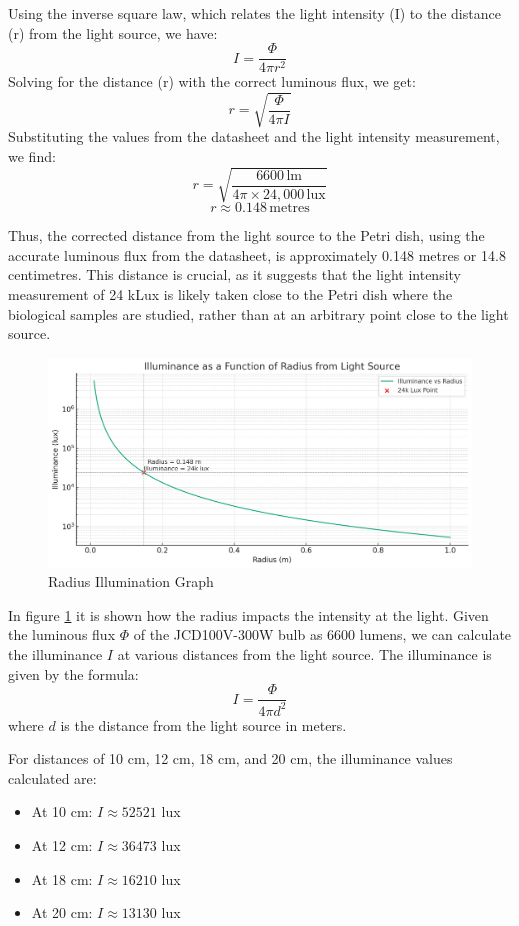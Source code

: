 Using the inverse square law, which relates the light intensity (I) to the distance (r) from the light source, we have:
\[
I = \frac{\Phi}{4\pi r^2}
\]
Solving for the distance (r) with the correct luminous flux, we get:
\[
r = \sqrt{\frac{\Phi}{4\pi I}}
\]
Substituting the values from the datasheet and the light intensity measurement, we find:
\[
r = \sqrt{\frac{6600\, \text{lm}}{4\pi \times 24,000\, \text{lux}}}
\]
\[
r \approx 0.148\, \text{metres}
\]

Thus, the corrected distance from the light source to the Petri dish, using the accurate luminous flux from the datasheet, is approximately 0.148 metres or 14.8 centimetres. This distance is crucial, as it suggests that the light intensity measurement of 24 kLux is likely taken close to the Petri dish where the biological samples are studied, rather than at an arbitrary point close to the light source.

\begin{figure}
    \centering
    \includegraphics[width=\linewidth]{radius-illumination.jpg}
    \caption{Radius Illumination Graph}
    \label{fig:radius-illumination}
\end{figure}

In figure \ref{fig:radius-illumination} it is shown how the radius impacts the intensity at the light. 
Given the luminous flux \( \Phi \) of the JCD100V-300W bulb as 6600 lumens, we can calculate the illuminance \( I \) at various distances from the light source. The illuminance is given by the formula:
\[ I = \frac{\Phi}{4\pi d^2} \]
where \( d \) is the distance from the light source in meters.

For distances of 10 cm, 12 cm, 18 cm, and 20 cm, the illuminance values calculated are:

\begin{itemize}
    \item At 10 cm: \( I \approx 52521 \) lux
    \item At 12 cm: \( I \approx 36473 \) lux
    \item At 18 cm: \( I \approx 16210 \) lux
    \item At 20 cm: \( I \approx 13130 \) lux
\end{itemize}

